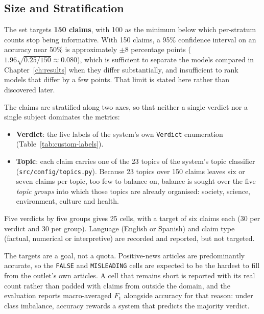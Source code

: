 
\subsection{Size and Stratification}
\label{subsec:custom-size}

The set targets \textbf{150 claims}, with 100 as the minimum below
which per-stratum counts stop being informative. With 150 claims, a
95\% confidence interval on an accuracy near 50\% is approximately
$\pm 8$ percentage points ($1.96\sqrt{0.25/150}\approx0.080$), which
is sufficient to separate the models compared in
Chapter~\ref{ch:results} when they differ substantially, and
insufficient to rank models that differ by a few points. That limit
is stated here rather than discovered later.

The claims are stratified along two axes, so that neither a single
verdict nor a single subject dominates the metrics:

\begin{itemize}
    \item \textbf{Verdict}: the five labels of the system's own
    \texttt{Verdict} enumeration (Table~\ref{tab:custom-labels}).
    \item \textbf{Topic}: each claim carries one of the 23 topics of
    the system's topic classifier (\texttt{src/config/topics.py}).
    Because 23 topics over 150 claims leaves six or seven claims per
    topic, too few to balance on, balance is sought over the five
    \emph{topic groups} into which those topics are already
    organised: society, science, environment, culture and health.
\end{itemize}

Five verdicts by five groups gives 25 cells, with a target of six
claims each (30 per verdict and 30 per group). Language (English or
Spanish) and claim type (factual, numerical or interpretive) are
recorded and reported, but not targeted.

The targets are a goal, not a quota. Positive-news articles are
predominantly accurate, so the \texttt{FALSE} and \texttt{MISLEADING}
cells are expected to be the hardest to fill from the outlet's own
articles. A cell that remains short is reported with its real count
rather than padded with claims from outside the domain, and the
evaluation reports macro-averaged $F_1$ alongside accuracy for that
reason: under class imbalance, accuracy rewards a system that
predicts the majority verdict.

